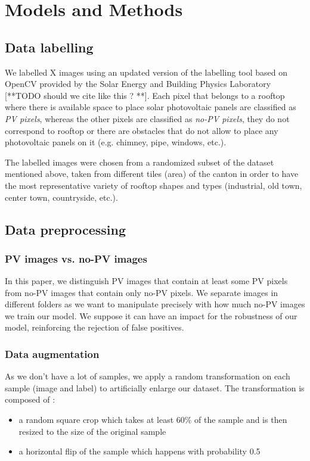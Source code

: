 \documentclass[10pt,conference]{IEEEtran}
\begin{document}
\section{Models and Methods}

\subsection{Data labelling}
We labelled X images using an updated version of the labelling tool based on OpenCV provided by the Solar Energy and Building Physics Laboratory [**TODO should we cite like this ? **]. Each pixel that belongs to a rooftop where there is available space to place solar photovoltaic panels are classified as \emph{PV pixels}, whereas the other pixels are classified as \emph{no-PV pixels}, they do not correspond to rooftop or there are obstacles that do not allow to place any photovoltaic panels on it (e.g. chimney, pipe, windows, etc.).

The labelled images were chosen from a randomized subset of the dataset mentioned above, taken from different tiles (area) of the canton in order to have the most representative variety of rooftop shapes and types (industrial, old town, center town, countryside, etc.). 

\subsection{Data preprocessing}

\subsubsection{PV images vs. no-PV images}
In this paper, we distinguish PV images that contain at least some PV pixels from no-PV images that contain only no-PV pixels. We separate images in different folders as we want to manipulate precisely with how much no-PV images we train our model. We suppose it can have an impact for the robustness of our model, reinforcing the rejection of false positives.  

\subsubsection{Data augmentation}
As we don’t have a lot of samples, we apply a random transformation on each sample (image and label) to artificially enlarge our dataset. The transformation is composed of :  
\begin{itemize}
	\item a random square crop which takes at least 60\% of the sample and is then resized to the size of the original sample
	\item a horizontal flip of the sample which happens with probability 0.5
\end{itemize}
  
\end{document}
